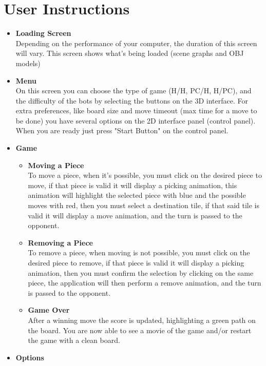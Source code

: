 \section{User Instructions}
\begin{itemize}
    \item \textbf{Loading Screen}\\
    \noindent Depending on the performance of your computer, the duration of this screen will vary.
    This screen shows what's being loaded (scene graphs and OBJ models)
    \item \textbf{Menu}\\
    \noindent On this screen you can choose the type of game (H/H, PC/H, H/PC), and the difficulty of the bots by selecting the buttons on the 3D interface.
    For extra preferences, like board size and move timeout (max time for a move to be done) you have several options on the 2D interface panel (control panel).
    When you are ready just press "Start Button" on the control panel.
    \item \textbf{Game}\\
    \begin{itemize}
        \item \textbf{Moving a Piece}\\
        \noindent To move a piece, when it's possible, you must click on the desired piece to move, if that piece is valid it will display a picking animation, this animation will
        highlight the selected piece with blue and the possible moves with red, then you must select a destination tile, if that said tile is valid it will display a move animation,
        and the turn is passed to the opponent.
        \item \textbf{Removing a Piece}\\
        \noindent To remove a piece, when moving is not possible, you must click on the desired piece to remove, if that piece is valid it will display a picking animation,
        then you must confirm the selection by clicking on the same piece, the application will then perform a remove animation, and the turn is passed to the opponent.
        \item \textbf{Game Over}\\
        \noindent After a winning move the score is updated, highlighting a green path on the board.
        You are now able to see a movie of the game and/or restart the game with a clean board.
    \end{itemize}
    \item \textbf{Options}

\end{itemize}
